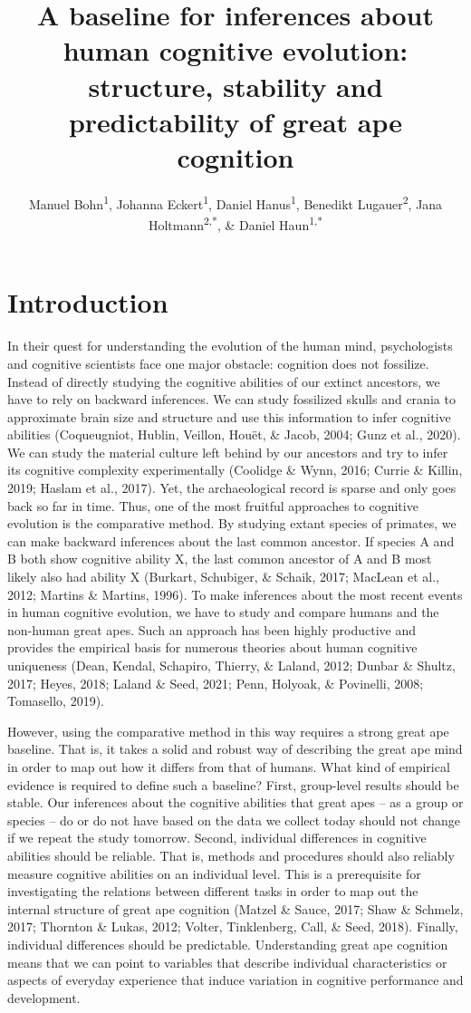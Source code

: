 \documentclass[
  man,floatsintext]{apa6}
\title{A baseline for inferences about human cognitive evolution: structure, stability and predictability of great ape cognition}
\author{Manuel Bohn\textsuperscript{1}, Johanna Eckert\textsuperscript{1}, Daniel Hanus\textsuperscript{1}, Benedikt Lugauer\textsuperscript{2}, Jana Holtmann\textsuperscript{2,*}, \& Daniel Haun\textsuperscript{1,*}}
\date{}
\affiliation{\vspace{0.5cm}\textsuperscript{1} Department of Comparative Cultural Psychology, Max Planck Institute for Evolutionary Anthropology, Leipzig, Germany\\\textsuperscript{2} Psychologische Hochschule Berlin, Berlin, Germany\\\textsuperscript{*} Shared senior authorship}
\begin{document}
\maketitle

\hypertarget{introduction}{%
\section{Introduction}\label{introduction}}

In their quest for understanding the evolution of the human mind, psychologists and cognitive scientists face one major obstacle: cognition does not fossilize. Instead of directly studying the cognitive abilities of our extinct ancestors, we have to rely on backward inferences. We can study fossilized skulls and crania to approximate brain size and structure and use this information to infer cognitive abilities (Coqueugniot, Hublin, Veillon, Houët, \& Jacob, 2004; Gunz et al., 2020). We can study the material culture left behind by our ancestors and try to infer its cognitive complexity experimentally (Coolidge \& Wynn, 2016; Currie \& Killin, 2019; Haslam et al., 2017). Yet, the archaeological record is sparse and only goes back so far in time. Thus, one of the most fruitful approaches to cognitive evolution is the comparative method. By studying extant species of primates, we can make backward inferences about the last common ancestor. If species A and B both show cognitive ability X, the last common ancestor of A and B most likely also had ability X (Burkart, Schubiger, \& Schaik, 2017; MacLean et al., 2012; Martins \& Martins, 1996). To make inferences about the most recent events in human cognitive evolution, we have to study and compare humans and the non-human great apes. Such an approach has been highly productive and provides the empirical basis for numerous theories about human cognitive uniqueness (Dean, Kendal, Schapiro, Thierry, \& Laland, 2012; Dunbar \& Shultz, 2017; Heyes, 2018; Laland \& Seed, 2021; Penn, Holyoak, \& Povinelli, 2008; Tomasello, 2019).

However, using the comparative method in this way requires a strong great ape baseline. That is, it takes a solid and robust way of describing the great ape mind in order to map out how it differs from that of humans. What kind of empirical evidence is required to define such a baseline? First, group-level results should be stable. Our inferences about the cognitive abilities that great apes -- as a group or species -- do or do not have based on the data we collect today should not change if we repeat the study tomorrow. Second, individual differences in cognitive abilities should be reliable. That is, methods and procedures should also reliably measure cognitive abilities on an individual level. This is a prerequisite for investigating the relations between different tasks in order to map out the internal structure of great ape cognition (Matzel \& Sauce, 2017; Shaw \& Schmelz, 2017; Thornton \& Lukas, 2012; Volter, Tinklenberg, Call, \& Seed, 2018). Finally, individual differences should be predictable. Understanding great ape cognition means that we can point to variables that describe individual characteristics or aspects of everyday experience that induce variation in cognitive performance and development.
\end{document}
